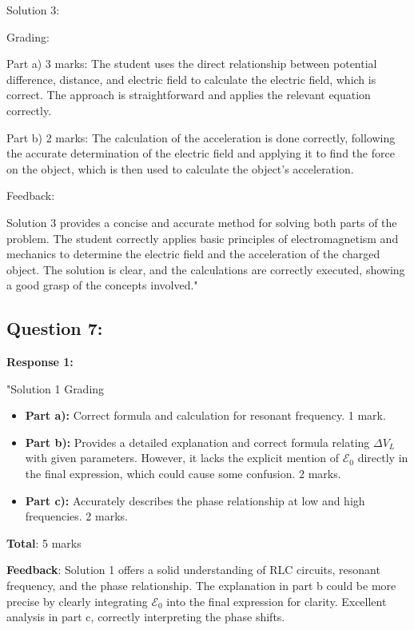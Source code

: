 \documentclass[a4paper,11pt]{article}
\begin{document}
Solution 3:

Grading:

Part a) 3 marks: The student uses the direct relationship between potential difference, distance, and electric field to calculate the electric field, which is correct. The approach is straightforward and applies the relevant equation correctly.

Part b) 2 marks: The calculation of the acceleration is done correctly, following the accurate determination of the electric field and applying it to find the force on the object, which is then used to calculate the object's acceleration.

Feedback:

Solution 3 provides a concise and accurate method for solving both parts of the problem. The student correctly applies basic principles of electromagnetism and mechanics to determine the electric field and the acceleration of the charged object. The solution is clear, and the calculations are correctly executed, showing a good grasp of the concepts involved."

\subsection*{Question 7:}

\textbf{Response 1:}

"Solution 1 Grading

\begin{itemize}
    \item \textbf{Part a):} Correct formula and calculation for resonant frequency. 1 mark.
    \item \textbf{Part b):} Provides a detailed explanation and correct formula relating \( \Delta V_{L} \) with given parameters. However, it lacks the explicit mention of \(\mathcal{E}_{0}\) directly in the final expression, which could cause some confusion. 2 marks.
    \item \textbf{Part c):} Accurately describes the phase relationship at low and high frequencies. 2 marks.
\end{itemize}

\textbf{Total}: 5 marks

\textbf{Feedback}: Solution 1 offers a solid understanding of RLC circuits, resonant frequency, and the phase relationship. The explanation in part b could be more precise by clearly integrating \(\mathcal{E}_{0}\) into the final expression for clarity. Excellent analysis in part c, correctly interpreting the phase shifts.
\end{document}
